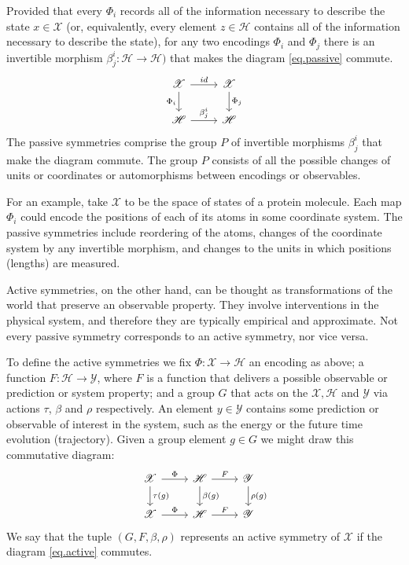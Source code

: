 \documentclass[preprint]{article} %
\renewcommand{\mathcal}[1]{\mathscr{#1}} %
\begin{document}
Provided that every $\Phi_i$ records all of the information necessary to describe the state $x\in \mathcal{X}$ (or, equivalently, every element $z\in \mathcal{H}$ contains all of the information necessary to describe the state),
for any two encodings $\Phi_i$ and $\Phi_j$ there is an invertible morphism $\beta_j^i:\mathcal{H}\to\mathcal{H})$ that makes the diagram \eqref{eq.passive} commute.
\begin{equation}\label{eq.passive}
\begin{tikzcd}[every label/.append ]
  {\mathcal{X}}\arrow[r, "id"] \arrow[d,"\Phi_i",swap] & {\mathcal{X}}  \arrow[d,"\Phi_j"]\\
{\mathcal{H}} \arrow[r, "\beta_j^i"]  & {\mathcal{H}} 
\end{tikzcd}
\end{equation}
The passive symmetries comprise the group $P$ of invertible morphisms $\beta_j^i$ that make the diagram commute.
The group $P$ consists of all the possible changes of units or coordinates or automorphisms between encodings or observables. 

For an example, take $\mathcal{X}$ to be the space of states of a protein molecule.
Each map $\Phi_i$ could encode the positions of each of its atoms in some coordinate system.
The passive symmetries include reordering of the atoms, changes of the coordinate system by any invertible morphism, and changes to the units in which positions (lengths) are measured.

Active symmetries, on the other hand, can be thought as transformations of the world that preserve an observable property.
They involve interventions in the physical system, and therefore they are typically empirical and approximate.
Not every passive symmetry corresponds to an active symmetry, nor vice versa.

To define the active symmetries we fix $\Phi:\mathcal X \to \mathcal{H}$ an encoding as above; a function $F: \mathcal H \to \mathcal Y$, where $F$ is a function that delivers a possible observable or prediction or system property; and a group $G$ that acts on the $\mathcal X, \mathcal H$ and $\mathcal Y$ via actions $\tau$, $\beta$ and $\rho$ respectively.
An element $y\in\mathcal{Y}$ contains some prediction or observable of interest in the system, such as the energy or the future time evolution (trajectory).
Given a group element $g\in G$ we might draw this commutative diagram:
\begin{equation}\label{eq.active}
\begin{tikzcd}[every label/.append]
  {\mathcal X}\arrow[r,"\Phi"] \arrow[d,"\tau(g)"] 
  & 
  {\mathcal H}  \arrow[d,"\beta(g)"] \arrow[r,"F"]
  & 
  {\mathcal Y}  \arrow[d,"\rho(g)"]
  \\
{\mathcal X} \arrow[r,"\Phi"]  
& 
{\mathcal H} \arrow[r,"F"]
&
{\mathcal Y} 
\end{tikzcd}
\end{equation}
We say that the tuple $(G, F, \beta, \rho)$ represents an active symmetry of $\mathcal X$ if the diagram \eqref{eq.active} commutes.
\end{document}
